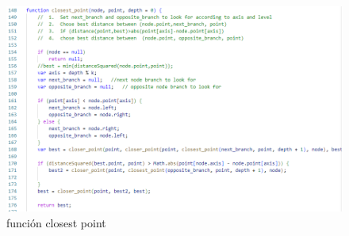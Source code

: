 \documentclass{article}
\begin{document}
\begin{enumerate}
\begin{figure}[H]
\centering
\includegraphics[width=1\textwidth]{Img/closest_point.png}
\caption{función closest point}
\end{figure}
    

    \end{enumerate}
	
		
	
\end{document}

